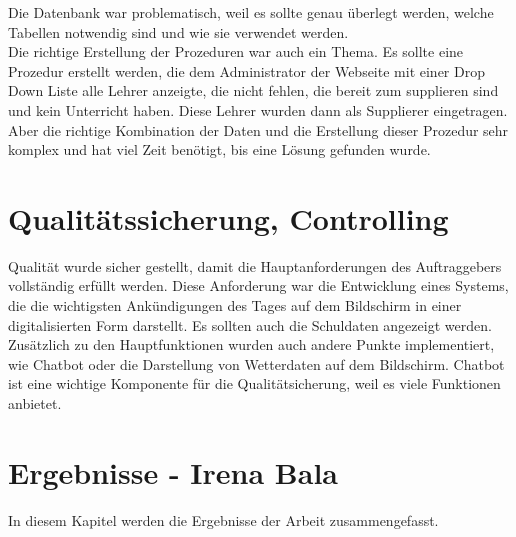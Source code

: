 Die Datenbank war problematisch, weil es sollte genau überlegt werden, welche Tabellen notwendig sind und wie sie verwendet werden. \\
Die richtige Erstellung der Prozeduren war auch ein Thema. Es sollte eine Prozedur erstellt werden, die dem Administrator der Webseite mit einer Drop Down Liste alle Lehrer anzeigte, die nicht fehlen, die bereit zum supplieren sind und kein Unterricht haben. Diese Lehrer wurden dann als Supplierer eingetragen. Aber die richtige Kombination der Daten und die Erstellung dieser Prozedur sehr komplex und hat viel Zeit benötigt, bis eine Lösung gefunden wurde. 
\section{Qualitätssicherung, Controlling}
Qualität wurde sicher gestellt, damit die Hauptanforderungen des Auftraggebers vollständig erfüllt werden. Diese Anforderung war die Entwicklung eines Systems, die die wichtigsten Ankündigungen des Tages auf dem Bildschirm in einer digitalisierten Form darstellt. Es sollten auch die Schuldaten angezeigt werden. \\
Zusätzlich zu den Hauptfunktionen wurden auch andere Punkte implementiert, wie Chatbot oder die Darstellung von Wetterdaten auf dem Bildschirm. Chatbot ist eine wichtige Komponente für die Qualitätsicherung, weil es viele Funktionen anbietet. 

\section{Ergebnisse - Irena Bala}
In diesem Kapitel werden die Ergebnisse der Arbeit zusammengefasst.
